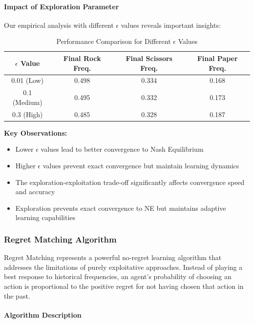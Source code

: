 \documentclass[conference]{IEEEtran}
\begin{document}
\paragraph{Impact of Exploration Parameter}

Our empirical analysis with different $\epsilon$ values reveals important insights:

\begin{table}[h!]
\centering
\caption{Performance Comparison for Different $\epsilon$ Values}
\begin{tabular}{|c|c|c|c|}
\hline
$\epsilon$ Value & Final Rock Freq. & Final Scissors Freq. & Final Paper Freq. \\
\hline
0.01 (Low) & 0.498 & 0.334 & 0.168 \\
0.1 (Medium) & 0.495 & 0.332 & 0.173 \\
0.3 (High) & 0.485 & 0.328 & 0.187 \\
\hline
\end{tabular}
\label{tab:epsilon_comparison}
\end{table}

\textbf{Key Observations:}
\begin{itemize}
    \item Lower $\epsilon$ values lead to better convergence to Nash Equilibrium
    \item Higher $\epsilon$ values prevent exact convergence but maintain learning dynamics
    \item The exploration-exploitation trade-off significantly affects convergence speed and accuracy
    \item Exploration prevents exact convergence to NE but maintains adaptive learning capabilities
\end{itemize}

\subsubsection{Regret Matching Algorithm}

Regret Matching represents a powerful no-regret learning algorithm that addresses the limitations of purely exploitative approaches. Instead of playing a best response to historical frequencies, an agent's probability of choosing an action is proportional to the positive regret for not having chosen that action in the past.

\paragraph{Algorithm Description}
\end{document}
